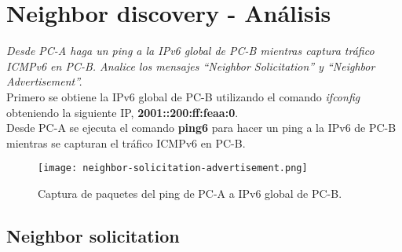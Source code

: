 \documentclass[osajnl,twocolumn,showpacs,superscriptaddress,10pt]{revtex4-1} %
\begin{document}
\section{Neighbor discovery - Análisis}

\textit{Desde PC-A haga un ping a la IPv6 global de PC-B mientras captura tráfico ICMPv6 en
PC-B. Analice los mensajes “Neighbor Solicitation” y “Neighbor Advertisement”.} \\

Primero se obtiene la IPv6 global de PC-B utilizando el comando \textit{ifconfig} obteniendo
la siguiente IP, \textbf{2001::200:ff:feaa:0}. \\

Desde PC-A se ejecuta el comando \textbf{ping6} para hacer un ping a la IPv6 de PC-B
mientras se capturan el tráfico ICMPv6 en PC-B. \\

\begin{figure}[H]
    \centering
    \texttt{[image: neighbor-solicitation-advertisement.png]}
    \caption{Captura de paquetes del ping de PC-A a IPv6 global de PC-B.}
    \label{image:neighbor-solicitation-advertisement}
\end{figure}

\subsection{Neighbor solicitation}
\end{document}
